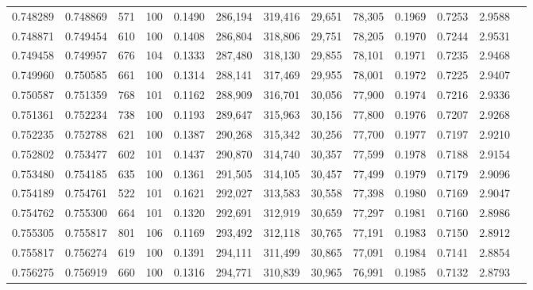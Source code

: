\begin{tabular}{rrrrrrrrrrrrr}
0.748289 & 0.748869 &   571 & 100 &                                     0.1490 & 286,194 & 319,416 &  29,651 &  78,305 & 0.1969 & 0.7253 & 2.9588 \\
0.748871 & 0.749454 &   610 & 100 &                                     0.1408 & 286,804 & 318,806 &  29,751 &  78,205 & 0.1970 & 0.7244 & 2.9531 \\
0.749458 & 0.749957 &   676 & 104 &                                     0.1333 & 287,480 & 318,130 &  29,855 &  78,101 & 0.1971 & 0.7235 & 2.9468 \\
0.749960 & 0.750585 &   661 & 100 &                                     0.1314 & 288,141 & 317,469 &  29,955 &  78,001 & 0.1972 & 0.7225 & 2.9407 \\
0.750587 & 0.751359 &   768 & 101 &                                     0.1162 & 288,909 & 316,701 &  30,056 &  77,900 & 0.1974 & 0.7216 & 2.9336 \\
0.751361 & 0.752234 &   738 & 100 &                                     0.1193 & 289,647 & 315,963 &  30,156 &  77,800 & 0.1976 & 0.7207 & 2.9268 \\
0.752235 & 0.752788 &   621 & 100 &                                     0.1387 & 290,268 & 315,342 &  30,256 &  77,700 & 0.1977 & 0.7197 & 2.9210 \\
0.752802 & 0.753477 &   602 & 101 &                                     0.1437 & 290,870 & 314,740 &  30,357 &  77,599 & 0.1978 & 0.7188 & 2.9154 \\
0.753480 & 0.754185 &   635 & 100 &                                     0.1361 & 291,505 & 314,105 &  30,457 &  77,499 & 0.1979 & 0.7179 & 2.9096 \\
0.754189 & 0.754761 &   522 & 101 &                                     0.1621 & 292,027 & 313,583 &  30,558 &  77,398 & 0.1980 & 0.7169 & 2.9047 \\
0.754762 & 0.755300 &   664 & 101 &                                     0.1320 & 292,691 & 312,919 &  30,659 &  77,297 & 0.1981 & 0.7160 & 2.8986 \\
0.755305 & 0.755817 &   801 & 106 &                                     0.1169 & 293,492 & 312,118 &  30,765 &  77,191 & 0.1983 & 0.7150 & 2.8912 \\
0.755817 & 0.756274 &   619 & 100 &                                     0.1391 & 294,111 & 311,499 &  30,865 &  77,091 & 0.1984 & 0.7141 & 2.8854 \\
0.756275 & 0.756919 &   660 & 100 &                                     0.1316 & 294,771 & 310,839 &  30,965 &  76,991 & 0.1985 & 0.7132 & 2.8793 \\

\end{tabular}
